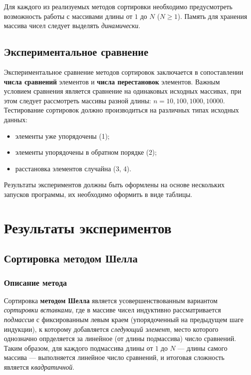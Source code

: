 \documentclass[a4paper,12pt,titlepage,finall]{article}
\begin{document}
Для каждого из реализуемых методов сортировки необходимо предусмотреть возможность работы с массивами длины от $1$ до $N$ ($N \geqslant 1$). Память для хранения массива чисел следует выделять \textit{динамически}.

\subsection{Экспериментальное сравнение}

Экспериментальное сравнение методов сортировок заключается в сопоставлении \textbf{числа сравнений} элементов и \textbf{числа перестановок} элементов. Важным условием сравнения является сравнение на одинаковых исходных массивах, при этом следует рассмотреть массивы разной длины: $n = 10, 100, 1000, 10000$. Тестирование сортировок должно производиться на различных типах исходных данных:

\begin{itemize}

    \item элементы уже упорядочены (1);
    \item элементы упорядочены в обратном порядке (2);
    \item расстановка элементов случайна (3, 4).

\end{itemize}

Результаты экспериментов должны быть оформлены на основе нескольких запусков программы, их необходимо оформить в виде таблицы.


\newpage

\section{Результаты экспериментов}

\subsection{Сортировка методом Шелла}

\subsubsection*{Описание метода} 

Сортировка  \textbf{методом Шелла} является усовершенствованным вариантом \textit{сортировки вставками}, где в массиве чисел индуктивно рассматривается \textit{подмассив} с фиксированным левым краем (упорядоченный на предыдущем шаге индукции), к которому добавляется \textit{следующий элемент}, место которого однозначно опрделяется за линейное (от длины подмассива) число сравнений. Таким образом, для каждого подмассива длины от $1$ до $N$ — длины самого массива — выполняется линейное число сравнений, и итоговая сложность является \textit{квадратичной}.
\end{document}
